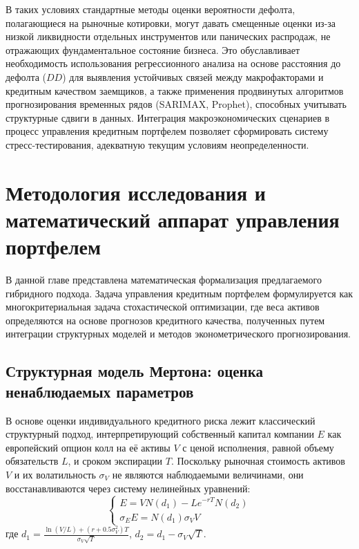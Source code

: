\documentclass[]{article}
\begin{document}
	В таких условиях стандартные методы оценки вероятности дефолта, полагающиеся на рыночные котировки, могут давать
	смещенные оценки из-за низкой ликвидности отдельных инструментов или панических распродаж, не отражающих
	фундаментальное состояние бизнеса. Это обуславливает необходимость использования регрессионного анализа на основе
	расстояния до дефолта ($DD$) для выявления устойчивых связей между макрофакторами и кредитным качеством заемщиков,
	а также применения продвинутых алгоритмов прогнозирования временных рядов (SARIMAX, Prophet), способных учитывать
	структурные сдвиги в данных. Интеграция макроэкономических сценариев в процесс управления кредитным портфелем
	позволяет сформировать систему стресс-тестирования, адекватную текущим условиям неопределенности.


	\newpage
	\section{Методология исследования и математический аппарат управления портфелем}

	В данной главе представлена математическая формализация предлагаемого гибридного подхода. Задача управления
	кредитным портфелем формулируется как многокритериальная задача стохастической оптимизации, где веса активов
	определяются на основе прогнозов кредитного качества, полученных путем интеграции структурных моделей и методов
	эконометрического прогнозирования.

	\subsection{Структурная модель Мертона: оценка ненаблюдаемых параметров}

	В основе оценки индивидуального кредитного риска лежит классический структурный подход, интерпретирующий собственный
	капитал компании $E$ как европейский опцион колл на её активы $V$ с ценой исполнения, равной объему обязательств $L$,
	и сроком экспирации $T$. Поскольку рыночная стоимость активов $V$ и их волатильность $\sigma_V$ не являются
	наблюдаемыми величинами, они восстанавливаются через систему нелинейных уравнений:
	\begin{equation}
		\label{merton_system}
		\begin{cases}
			E = V N(d_1) - L e^{-rT} N(d_2) \\
			\sigma_E E = N(d_1) \sigma_V V
		\end{cases}
	\end{equation}
	где $d_1 = \frac{\ln(V/L) + (r + 0.5\sigma_V^2)T}{\sigma_V\sqrt{T}}$, $d_2 = d_1 - \sigma_V\sqrt{T}$.
\end{document}
